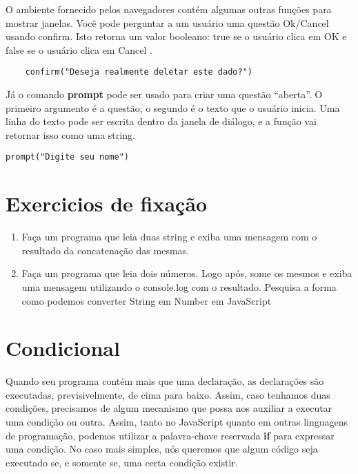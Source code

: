 O ambiente fornecido pelos navegadores contém algumas outras funções para mostrar janelas. Você pode perguntar a um usuário uma questão Ok/Cancel usando confirm. Isto retorna um valor booleano: true se o usuário clica em OK e false se o usuário clica em Cancel \cite{haverbeke2014eloquent}.

\begin{lstlisting}
	confirm("Deseja realmente deletar este dado?")
\end{lstlisting}

Já o comando \textbf{prompt} pode ser usado para criar uma questão ``aberta''. O primeiro argumento é a questão; o segundo é o texto que o usuário inicia. Uma linha do texto pode ser escrita dentro da janela de diálogo, e a função vai retornar isso como uma string.

\begin{lstlisting}
prompt("Digite seu nome")
\end{lstlisting}

\section{Exercicios de fixação}

\begin{enumerate}
	\item Faça um programa que leia duas string e exiba uma mensagem com o resultado da concatenação das mesmas. 
	
	\item Faça um programa que leia dois números. Logo após, some os mesmos e exiba uma mensagem utilizando o console.log com o resultado. Pesquisa a forma como podemos converter String em Number em JavaScript 
\end{enumerate}

\section{Condicional}

Quando seu programa contém mais que uma declaração, as declarações são executadas, previsivelmente, de cima para baixo. Assim, caso tenhamos duas condições, precisamos de algum mecanismo que possa nos auxiliar a executar uma condição ou outra. Assim, tanto no JavaScript quanto em outras linguagens de programação, podemos utilizar a palavra-chave reservada \textbf{if} para expressar uma condição. No caso mais simples, nós queremos que algum código seja executado se, e somente se, uma certa condição existir. 

